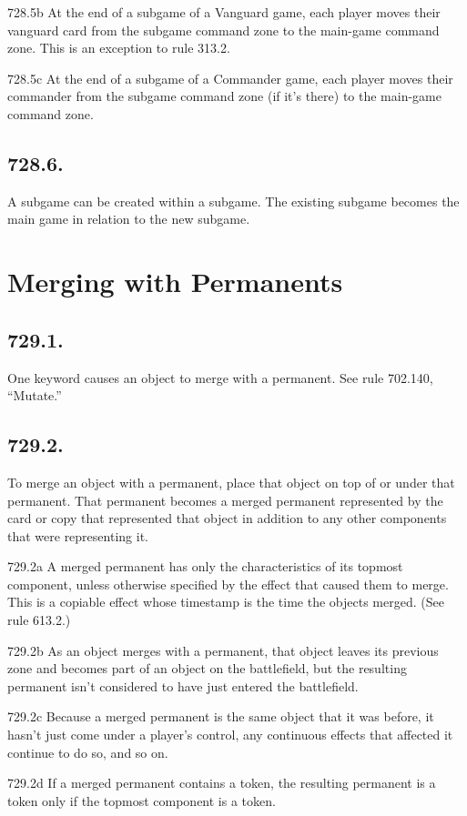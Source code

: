 728.5b At the end of a subgame of a Vanguard game, each player moves their vanguard card from the subgame command zone to the main-game command zone. This is an exception to rule 313.2.

728.5c At the end of a subgame of a Commander game, each player moves their commander from the subgame command zone (if it’s there) to the main-game command zone.

\subsection*{728.6.}
A subgame can be created within a subgame. The existing subgame becomes the main game in relation to the new subgame.

\section{Merging with Permanents}
\subsection*{729.1.}
One keyword causes an object to merge with a permanent. See rule 702.140, “Mutate.”

\subsection*{729.2.}
To merge an object with a permanent, place that object on top of or under that permanent. That permanent becomes a merged permanent represented by the card or copy that represented that object in addition to any other components that were representing it.

729.2a A merged permanent has only the characteristics of its topmost component, unless otherwise specified by the effect that caused them to merge. This is a copiable effect whose timestamp is the time the objects merged. (See rule 613.2.)

729.2b As an object merges with a permanent, that object leaves its previous zone and becomes part of an object on the battlefield, but the resulting permanent isn’t considered to have just entered the battlefield.

729.2c Because a merged permanent is the same object that it was before, it hasn’t just come under a player’s control, any continuous effects that affected it continue to do so, and so on.

729.2d If a merged permanent contains a token, the resulting permanent is a token only if the topmost component is a token.

